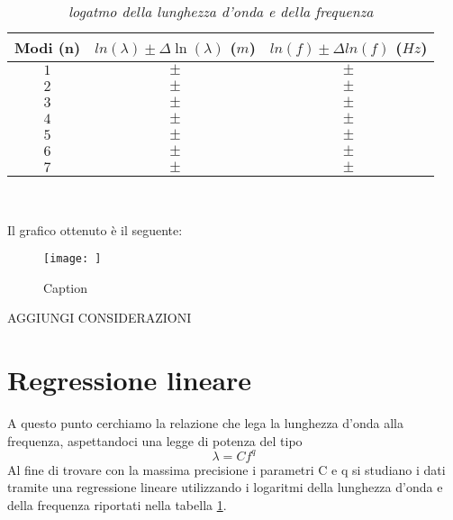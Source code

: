\documentclass[12pt, a4paper]{article}
\begin{document}
\begin{table}[ht] %
 \centering

\begin{tabular}{|c|c|c|} 
 \hline
  \footnotesize{Modi (n)}& \footnotesize{$ln(\lambda)\pm\Delta \ln(\lambda)$ ($m$)}  & \footnotesize{$ln(f) \pm \Delta ln(f) $ ($Hz$)} \\ 
\hline
 $1$ & \footnotesize{$\pm$} & \footnotesize{$\pm$} \\   
 $2$ & \footnotesize{$\pm$} & \footnotesize{$\pm$} \\
 $3$ & \footnotesize{$\pm$} & \footnotesize{$\pm$} \\
 $4$ & \footnotesize{$\pm$} & \footnotesize{$\pm$} \\
 $5$ & \footnotesize{$\pm$} & \footnotesize{$\pm$} \\
 $6$ & \footnotesize{$\pm$} & \footnotesize{$\pm$} \\
 $7$ & \footnotesize{$\pm$} & \footnotesize{$\pm$} \\
\hline

\end{tabular}\\
\caption{\small{\textit{logatmo della lunghezza d'onda e della frequenza} }}
    \label{tab:Logaritmo lunghezza d'onda e frequenza}
\end{table}

Il grafico ottenuto è il seguente: 

\begin{figure}[h!]
    \centering
    \texttt{[image: ]}
    \caption{Caption}
    \label{f}
\end{figure}

AGGIUNGI CONSIDERAZIONI



\section{Regressione lineare}
A questo punto cerchiamo la relazione che lega la lunghezza d'onda alla frequenza, aspettandoci una legge di potenza del tipo 
\begin{equation*}
    \lambda = Cf^{q}
\end{equation*}
Al fine di trovare con la massima precisione i parametri C e q si studiano i dati tramite una regressione lineare utilizzando i logaritmi della lunghezza d'onda e della frequenza riportati nella tabella \ref{tab:Logaritmo lunghezza d'onda e frequenza}.
\end{document}
